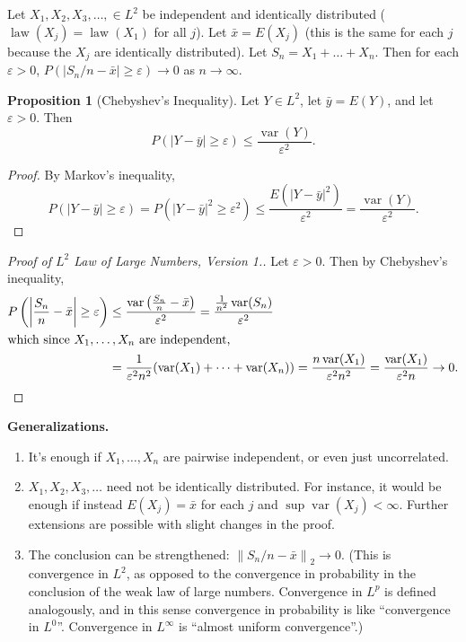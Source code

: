 \documentclass{article}
\DeclareMathOperator{\law}{law}
\DeclareMathOperator{\var}{var}
\newcommand{\norm}[1]{\left\lVert#1\right\rVert} %
\theoremstyle{definition}
\newtheorem{proposition}[theorem]{Proposition}
\begin{document}
Let $X_1, X_2, X_3, \dots, \in L^2$ be independent and identically distributed ($\law(X_j) = \law(X_1)$ for all $j$). Let $\bar{x} = E(X_j)$ (this is the same for each $j$ because the $X_j$ are identically distributed). Let $S_n = X_1 + \dots + X_n$. Then for each $\varepsilon > 0$, $P(|S_n/n - \bar{x}| \geq \varepsilon) \to 0$ as $n \to \infty$.

\begin{proposition}[Chebyshev's Inequality]
Let $Y \in L^2$, let $\bar{y} = E(Y)$, and let $\varepsilon > 0$. Then
\[
    P(|Y-\bar{y}| \geq \varepsilon) \leq \frac{\var(Y)}{\varepsilon^2}.
\]
\end{proposition}
\begin{proof} By Markov's inequality,
    \[
        P(|Y-\bar{y}| \geq \varepsilon) = P(|Y-\bar{y}|^2 \geq \varepsilon^2) \leq \frac{E(|Y-\bar{y}|^2)}{\varepsilon^2} = \frac{\var(Y)}{\varepsilon^2}.
    \]
\end{proof}

\begin{proof}[Proof of $L^2$ Law of Large Numbers, Version 1.]
    Let $\varepsilon > 0$. Then by Chebyshev's inequality,
    \begin{align*}
        P\left( \left| \frac{S_n}{n} - \bar{x} \right| \geq \varepsilon \right)
            &\leq \frac{\var\left(\frac{S_n}{n} - \bar{x}\right)}{\varepsilon^2}
            = \frac{\frac{1}{n^2}\var(S_n)}{\varepsilon^2} \\
        \intertext{which since $X_1, \dots, X_n$ are independent,}
            &= \frac{1}{\varepsilon^2 n^2}(\var(X_1) + \dots + \var(X_n))
            = \frac{n\var(X_1)}{\varepsilon^2 n^2} = \frac{\var(X_1)}{\varepsilon^2 n} \to 0.
    \end{align*}
\end{proof}

\textbf{Generalizations.}
\begin{enumerate}
    \item It's enough if $X_1, \dots, X_n$ are pairwise independent, or even just uncorrelated.
    \item $X_1, X_2, X_3, \dots$ need not be identically distributed. For instance, it would be enough if instead $E(X_j) = \bar{x}$ for each $j$ and $\sup \var(X_j) < \infty$. Further extensions are possible with slight changes in the proof.
    \item The conclusion can be strengthened: $\norm{S_n/n - \bar{x}}_2 \to 0$. (This is convergence in $L^2$, as opposed to the convergence in probability in the conclusion of the weak law of large numbers. Convergence in $L^p$ is defined analogously, and in this sense convergence in probability is like ``convergence in $L^0$''. Convergence in $L^\infty$ is ``almost uniform convergence''.)
\end{enumerate}
\end{document}
